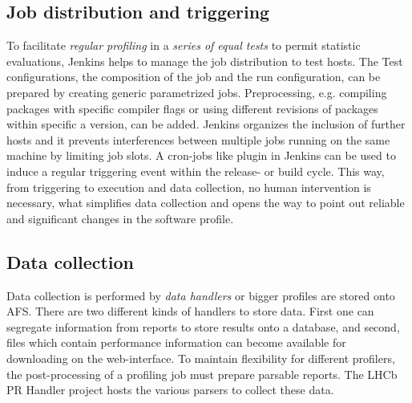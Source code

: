 \documentclass[a4paper]{jpconf}
\begin{document}
\subsection{Job distribution and triggering}
\label{sec:job_distribution}

To facilitate \textit{regular profiling} in a \textit{series of equal tests} to permit statistic evaluations, Jenkins helps to manage the job distribution to test hosts. The Test configurations, the composition of the job and the run configuration, can be prepared by creating generic parametrized jobs. Preprocessing, e.g. compiling packages with specific compiler flags or using different revisions of packages within specific a version, can be added. Jenkins organizes the inclusion of further hosts and it prevents interferences between multiple jobs running on the same machine by limiting job slots.
\newline
A cron-jobs like plugin in Jenkins can be used to induce a regular triggering event within the release- or build cycle. This way, from triggering to execution and data collection, no human intervention is necessary, what simplifies data collection and opens the way to point out reliable and significant changes in the software profile.

\subsection{Data collection}
\label{sec:data_collection}

Data collection is performed by \textit{data handlers} or bigger profiles are stored onto AFS. There are two different kinds of handlers to store data. First one can segregate information from reports to store results onto a database, and second, files which contain performance information can become available for downloading on the web-interface. To maintain flexibility for different profilers, the post-processing of a profiling job must prepare parsable reports. The LHCb PR Handler project hosts the various parsers to collect these data.
\end{document}
